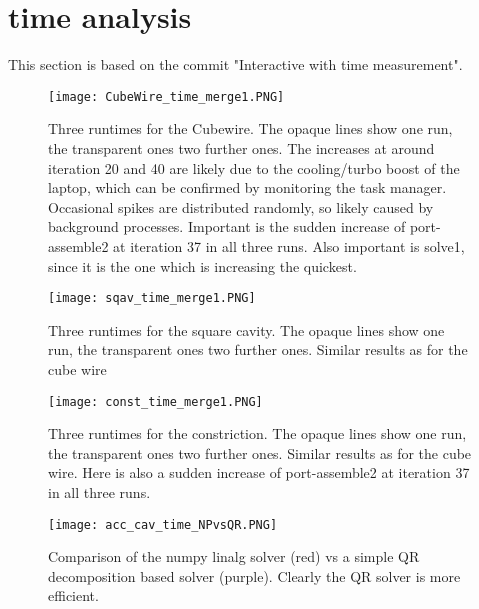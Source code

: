 




\section{time analysis}
This section is based on the commit "Interactive with time measurement".

\begin{figure}[h]
	\centering
	\texttt{[image: CubeWire\_time\_merge1.PNG]}
	\caption{Three runtimes for the Cubewire. The opaque lines show one run, the transparent ones two further ones. The increases at around iteration 20 and 40 are likely due to the cooling/turbo boost of the laptop, which can be confirmed by monitoring the task manager. Occasional spikes are distributed randomly, so likely caused by background processes. Important is the sudden increase of port-assemble2 at iteration 37 in all three runs. Also important is solve1, since it is the one which is increasing the quickest.}
	\label{}
\end{figure}


\begin{figure}[h]
	\centering
	\texttt{[image: sqav\_time\_merge1.PNG]}
	\caption{Three runtimes for the square cavity. The opaque lines show one run, the transparent ones two further ones. Similar results as for the cube wire}
	\label{}
\end{figure}



\begin{figure}[h]
	\centering
	\texttt{[image: const\_time\_merge1.PNG]}
	\caption{Three runtimes for the constriction. The opaque lines show one run, the transparent ones two further ones. Similar results as for the cube wire. Here is also a sudden increase of port-assemble2 at iteration 37 in all three runs.}
	\label{}
\end{figure}


\begin{figure}[h]
	\centering
	\texttt{[image: acc\_cav\_time\_NPvsQR.PNG]}
	\caption{Comparison of the numpy linalg solver (red) vs a simple QR decomposition based solver (purple). Clearly the QR solver is more efficient.}
	\label{}
\end{figure}

































